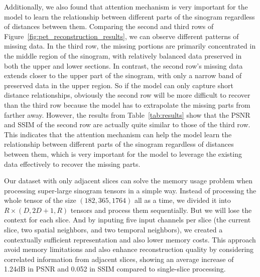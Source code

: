 \documentclass[12pt]{iopart}
\begin{document}
Additionally, we also found that attention mechanism is very important for the model to learn the relationship between different parts of the sinogram regardless of distances between them.
Comparing the second and third rows of Figure~\ref{fig:pet_reconstruction_results}, we can observe different patterns of missing data. In the third row, the missing portions are primarily concentrated in the middle region of the sinogram, with relatively balanced data preserved in both the upper and lower sections. In contrast, the second row's missing data extends closer to the upper part of the sinogram, with only a narrow band of preserved data in the upper region.  
So if the model can only capture short distance relationships, obviously the second row will be more difficult to recover than the third row because the model has to extrapolate the missing parts from farther away.
However, the results from Table~\ref{tab:results} show that the PSNR and SSIM of the second row are actually quite similar to those of the third row. This indicates that the attention mechanism can help the model learn the relationship between different parts of the sinogram regardless of distances between them, which is very important for the model to leverage the existing data effectively to recover the missing parts.

Our dataset with only adjacent slices can solve the memory usage problem when processing super-large sinogram tensors in a simple way. Instead of processing the whole tensor of the size $(182, 365, 1764)$ all as a time, we divided it into $R\times(D, 2D+1, R)$ tensors and process them sequentially. But we will lose the context for each slice. And by inputing five input channels per slice (the current slice, two spatial neighbors, and two temporal neighbors), we created a contextually sufficient representation and also lower memory costs. This approach  avoid memory limitations and also enhance reconstruction quality by considering correlated information from adjacent slices, showing an average increase of 1.24dB in PSNR and 0.052 in SSIM compared to single-slice processing.
\end{document}
